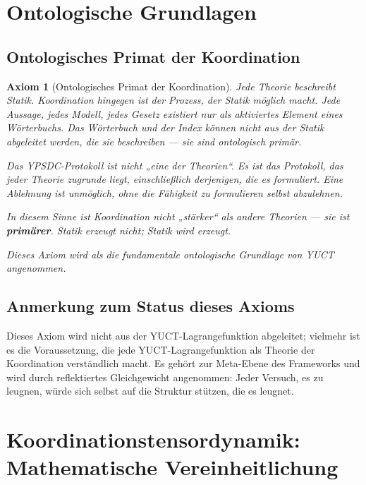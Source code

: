 \documentclass[11pt,a4paper]{article}
\newtheorem{axiom}{Axiom}
\begin{document}
	
	\section{Ontologische Grundlagen}
	\label{sec:ontological-foundations}
	
	\subsection{Ontologisches Primat der Koordination}
	\begin{axiom}[Ontologisches Primat der Koordination]
		Jede Theorie beschreibt Statik. Koordination hingegen ist der Prozess, der Statik möglich macht.
		Jede Aussage, jedes Modell, jedes Gesetz existiert nur als aktiviertes Element eines Wörterbuchs.
		Das Wörterbuch und der Index können nicht aus der Statik abgeleitet werden, die sie beschreiben — sie sind ontologisch primär.
		
		Das YPSDC-Protokoll ist nicht „eine der Theorien“.
		Es ist das Protokoll, das jeder Theorie zugrunde liegt, einschließlich derjenigen, die es formuliert.
		Eine Ablehnung ist unmöglich, ohne die Fähigkeit zu formulieren selbst abzulehnen.
		
		In diesem Sinne ist Koordination nicht „stärker“ als andere Theorien — sie ist \textbf{primärer}.
		Statik erzeugt nicht; Statik wird erzeugt.
		
		Dieses Axiom wird als die fundamentale ontologische Grundlage von YUCT angenommen.
	\end{axiom}
	\subsection*{Anmerkung zum Status dieses Axioms}
	Dieses Axiom wird nicht aus der YUCT-Lagrangefunktion abgeleitet; vielmehr ist es die Voraussetzung, die jede YUCT-Lagrangefunktion als Theorie der Koordination verständlich macht. Es gehört zur Meta-Ebene des Frameworks und wird durch reflektiertes Gleichgewicht angenommen: Jeder Versuch, es zu leugnen, würde sich selbst auf die Struktur stützen, die es leugnet.
	
	\section{Koordinationstensordynamik: Mathematische Vereinheitlichung}
	\label{sec:ctd-unification}
	
\end{document}
